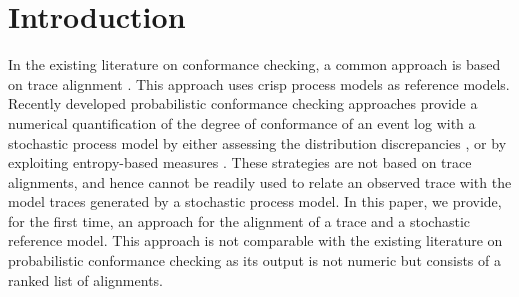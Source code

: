 \section{Introduction}


\label{introduction}
%
In the existing literature on conformance checking, a common approach is based on trace alignment \cite{DBLP:conf/edoc/AdriansyahDA11}. This approach uses crisp process models as reference models. Recently developed probabilistic conformance checking approaches provide a numerical quantification of the degree of conformance
of an event log with a stochastic process model by either assessing the distribution discrepancies \cite{DBLP:conf/bpm/LeemansSA19}, or by exploiting entropy-based measures \cite{DBLP:conf/icpm/PolyvyanyyK19,DBLP:journals/tosem/PolyvyanyySWCM20}.
These strategies are not based on trace alignments, and hence cannot be readily used to relate an observed trace with the model traces generated by a stochastic process model.
%
In this paper, we provide, for the first time, an approach for the alignment of a trace and a stochastic reference
model. This approach is not comparable with the existing literature on probabilistic conformance checking as its output is not numeric but consists of a ranked list of alignments.


